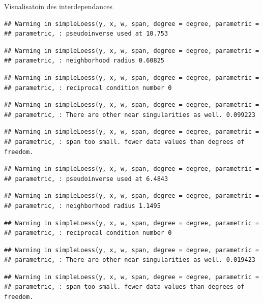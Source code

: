 \documentclass[11pt,ignorenonframetext,]{beamer}
\begin{document}
\begin{frame}[fragile]{Visualisatoin des interdependances}
\begin{verbatim}
## Warning in simpleLoess(y, x, w, span, degree = degree, parametric =
## parametric, : pseudoinverse used at 10.753
\end{verbatim}

\begin{verbatim}
## Warning in simpleLoess(y, x, w, span, degree = degree, parametric =
## parametric, : neighborhood radius 0.60825
\end{verbatim}

\begin{verbatim}
## Warning in simpleLoess(y, x, w, span, degree = degree, parametric =
## parametric, : reciprocal condition number 0
\end{verbatim}

\begin{verbatim}
## Warning in simpleLoess(y, x, w, span, degree = degree, parametric =
## parametric, : There are other near singularities as well. 0.099223
\end{verbatim}

\begin{verbatim}
## Warning in simpleLoess(y, x, w, span, degree = degree, parametric =
## parametric, : span too small. fewer data values than degrees of freedom.
\end{verbatim}

\begin{verbatim}
## Warning in simpleLoess(y, x, w, span, degree = degree, parametric =
## parametric, : pseudoinverse used at 6.4843
\end{verbatim}

\begin{verbatim}
## Warning in simpleLoess(y, x, w, span, degree = degree, parametric =
## parametric, : neighborhood radius 1.1495
\end{verbatim}

\begin{verbatim}
## Warning in simpleLoess(y, x, w, span, degree = degree, parametric =
## parametric, : reciprocal condition number 0
\end{verbatim}

\begin{verbatim}
## Warning in simpleLoess(y, x, w, span, degree = degree, parametric =
## parametric, : There are other near singularities as well. 0.019423
\end{verbatim}

\begin{verbatim}
## Warning in simpleLoess(y, x, w, span, degree = degree, parametric =
## parametric, : span too small. fewer data values than degrees of freedom.
\end{verbatim}


\end{frame}
\end{document}
